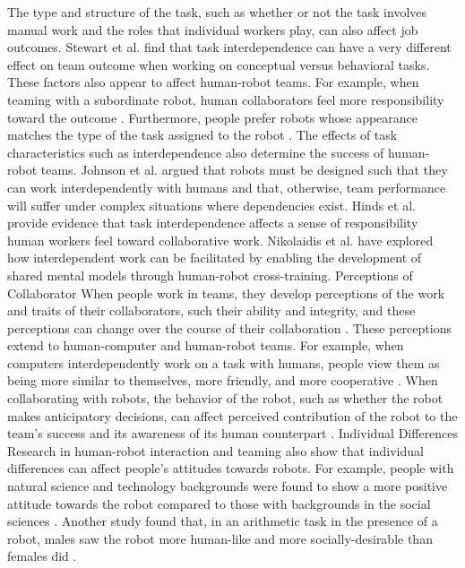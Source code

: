        The type and structure of the task, such as whether or not the task involves manual work and the roles that individual workers play, can also affect job outcomes. Stewart et al. \cite{stewart2000team} find that task interdependence can have a very different effect on team outcome when working on conceptual versus behavioral tasks. These factors also appear to affect human-robot teams. For example, when teaming with a subordinate robot, human collaborators feel more responsibility toward the outcome \cite{hinds2004whose}. Furthermore, people prefer robots whose appearance matches the type of the task assigned to the robot \cite{goetz2003matching}.
       The effects of task characteristics such as interdependence also determine the success of human-robot teams. Johnson et al. \cite{johnson2012autonomy} argued that robots must be designed such that they can work interdependently with humans and that, otherwise, team performance will suffer under complex situations where dependencies exist. Hinds et al. \cite{hinds2004whose} provide evidence that task interdependence affects a sense of responsibility human workers feel toward collaborative work. Nikolaidis et al. \cite{nikolaidis2012human, nikolaidis2013human} have explored how interdependent work can be facilitated  by enabling the development of shared mental models through human-robot cross-training. 
Perceptions of Collaborator
       When people work in teams, they develop perceptions of the work and traits of their collaborators, such their ability and integrity, and these perceptions can change over the course of their collaboration \cite{jarvenpaa1994global}. These perceptions extend to human-computer and human-robot teams. For example, when computers interdependently work on a task with humans, people view them as being more similar to themselves, more friendly, and more cooperative \cite{nass1996can}. When collaborating with robots, the behavior of the robot, such as whether the robot makes anticipatory decisions, can affect perceived contribution of the robot to the team’s success \cite{hoffman2007effects} and its awareness of its human counterpart \cite{huang2015adaptive}.
Individual Differences
       Research in human-robot interaction and teaming also show that individual differences can affect people’s attitudes towards robots. For example, people with natural science and technology backgrounds were found to show a more positive attitude towards the robot compared to those with backgrounds in the social sciences \cite{nomura2011exploring}. Another study found that, in an arithmetic task in the presence of a robot, males saw the robot more human-like and more socially-desirable than females did \cite{schermerhorn2008robot}.